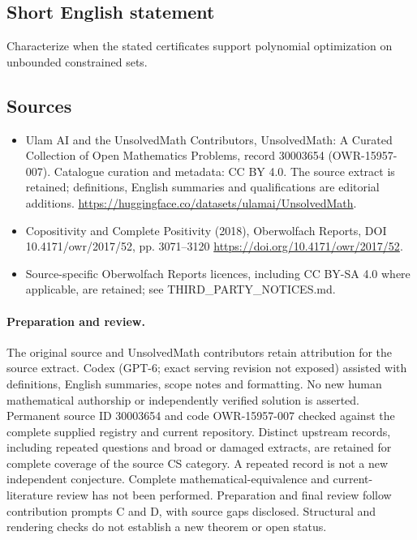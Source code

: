 \documentclass[11pt]{article}
\begin{document}
\subsection{Short English statement}
Characterize when the stated certificates support polynomial optimization on unbounded constrained sets.
\subsection{Sources}
\begin{itemize}
\item[\hypertarget{source:30003654:1}{S1}] Ulam AI and the UnsolvedMath Contributors, UnsolvedMath: A Curated Collection of Open Mathematics Problems, record 30003654 (OWR-15957-007). Catalogue curation and metadata: CC BY 4.0. The source extract is retained; definitions, English summaries and qualifications are editorial additions.
\url{https://huggingface.co/datasets/ulamai/UnsolvedMath}.
\item[\hypertarget{source:30003654:2}{S2}] Copositivity and Complete Positivity (2018), Oberwolfach Reports, DOI 10.4171/owr/2017/52, pp. 3071--3120
\url{https://doi.org/10.4171/owr/2017/52}.
\item Source-specific Oberwolfach Reports licences, including CC BY-SA 4.0 where applicable, are retained; see THIRD\_PARTY\_NOTICES.md.
\end{itemize}
\paragraph{Preparation and review.}
The original source and UnsolvedMath contributors retain attribution for the source extract. Codex (GPT-6; exact serving revision not exposed) assisted with definitions, English summaries, scope notes and formatting. No new human mathematical authorship or independently verified solution is asserted. Permanent source ID 30003654 and code OWR-15957-007 checked against the complete supplied registry and current repository. Distinct upstream records, including repeated questions and broad or damaged extracts, are retained for complete coverage of the source CS category. A repeated record is not a new independent conjecture. Complete mathematical-equivalence and current-literature review has not been performed. Preparation and final review follow contribution prompts C and D, with source gaps disclosed. Structural and rendering checks do not establish a new theorem or open status.
\label{end:30003654}
\end{document}
